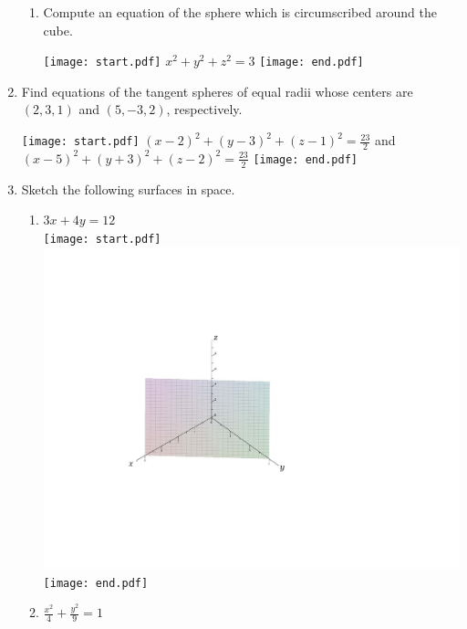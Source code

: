 \documentclass[12pt]{article}
\begin{document}
\begin{enumerate}
\begin{enumerate}
\item Compute an equation of the sphere which is circumscribed around the cube.

\texttt{[image: start.pdf]}
{{$x^2+y^2+z^2=3$}}
\texttt{[image: end.pdf]}


\end{enumerate}

\item Find equations of the tangent spheres of equal radii whose centers are $(2,3,1)$ and $(5,-3,2)$, respectively.

\texttt{[image: start.pdf]}
{{$(x-2)^2+(y-3)^2+(z-1)^2=\frac{23}{2}$ and $(x-5)^2+(y+3)^2+(z-2)^2=\frac{23}{2}$}}
\texttt{[image: end.pdf]}


\item Sketch the following surfaces in space.

\begin{enumerate}

\item $3x+4y=12$\\

\texttt{[image: start.pdf]}
{{\includegraphics[scale=0.5]{plane.pdf}}}
\texttt{[image: end.pdf]}


\item $\frac{x^2}{4}+\frac{y^2}{9}=1$\\


\end{enumerate}
\end{enumerate}
\end{document}
